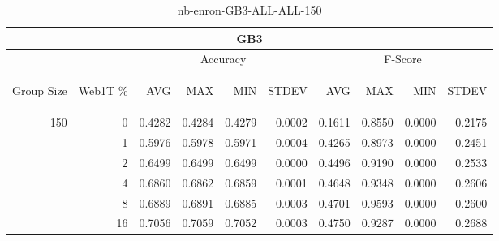 \begin{center}
\begin{table}[htbp]
\begin{tabular}{ | r | r | r | r | r | r | r | r | r | r |}
\hline
\multicolumn{10}{|c|}{GB3}\\
\hline
 & & \multicolumn{4}{|c|}{Accuracy} & \multicolumn{4}{|c|}{F-Score}\\ \cline{3-10}
\begin{sideways}Group Size\end{sideways} & \begin{sideways}Web1T \%\end{sideways} & \begin{sideways}AVG\end{sideways} & \begin{sideways}MAX\end{sideways} & \begin{sideways}MIN\end{sideways} & \begin{sideways}STDEV\end{sideways} & \begin{sideways}AVG\end{sideways} & \begin{sideways}MAX\end{sideways} & \begin{sideways}MIN\end{sideways} & \begin{sideways}STDEV\end{sideways}\\
\hline
\multirow{5}{*}{150}
 & 0 & 0.4282 & 0.4284 & 0.4279 & 0.0002 & 0.1611 & 0.8550 & 0.0000 & 0.2175\\ \cline{2-10}
 & 1 & 0.5976 & 0.5978 & 0.5971 & 0.0004 & 0.4265 & 0.8973 & 0.0000 & 0.2451\\ \cline{2-10}
 & 2 & 0.6499 & 0.6499 & 0.6499 & 0.0000 & 0.4496 & 0.9190 & 0.0000 & 0.2533\\ \cline{2-10}
 & 4 & 0.6860 & 0.6862 & 0.6859 & 0.0001 & 0.4648 & 0.9348 & 0.0000 & 0.2606\\ \cline{2-10}
 & 8 & 0.6889 & 0.6891 & 0.6885 & 0.0003 & 0.4701 & 0.9593 & 0.0000 & 0.2600\\ \cline{2-10}
 & 16 & 0.7056 & 0.7059 & 0.7052 & 0.0003 & 0.4750 & 0.9287 & 0.0000 & 0.2688\\ \cline{2-10}
\hline
\end{tabular}
\caption{nb-enron-GB3-ALL-ALL-150}
\label{table:nb-enron-GB3-ALL-ALL-150}
\end{table}
\end{center}

